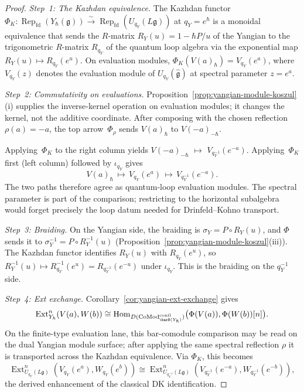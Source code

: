 \begin{proof}
\emph{Step~1: The Kazhdan equivalence.}
The Kazhdan functor~\cite{Drinfeld85}
$\Phi_K \colon \operatorname{Rep}_{\mathrm{fd}}(Y_\hbar(\mathfrak{g}))
\xrightarrow{\sim}
\operatorname{Rep}_{\mathrm{fd}}(U_{q_Y}(L\mathfrak{g}))$
at $q_Y=e^\hbar$ is a monoidal equivalence that sends
the $R$-matrix $R_Y(u) = 1 - \hbar P/u$ of the Yangian
to the trigonometric $R$-matrix $R_{q_Y}$ of the quantum loop algebra
via the exponential map
$R_Y(u) \mapsto R_{q_Y}(e^u)$. On evaluation modules,
$\Phi_K(V(a)_\hbar) = V_{q_Y}(e^a)$, where $V_{q_Y}(z)$ denotes
the evaluation module of
$U_{q_Y}(\widehat{\mathfrak{g}})$ at spectral parameter
$z = e^a$.

\smallskip\noindent\emph{Step~2: Commutativity on evaluations.}
Proposition~\ref{prop:yangian-module-koszul}(i) supplies the
inverse-kernel operation on evaluation modules; it changes the
kernel, not the additive coordinate. After composing with the chosen
reflection $\rho(a)=-a$, the top arrow~$\Phi_\rho$ sends
$V(a)_\hbar$ to $V(-a)_{-\hbar}$.

Applying~$\Phi_K$ to the right column yields
$V(-a)_{-\hbar}$ $\mapsto$ $V_{q_Y^{-1}}(e^{-a})$.
Applying~$\Phi_K$ first (left column) followed by
$\iota_{q_Y}$ gives
\[
V(a)_\hbar \,\mapsto\, V_{q_Y}(e^a) \,\mapsto\,
V_{q_Y^{-1}}(e^{-a}).
\]
The two paths therefore agree as quantum-loop evaluation modules.
The spectral parameter is part of the comparison; restricting to the
horizontal subalgebra would forget precisely the loop datum needed for
Drinfeld--Kohno transport.

\emph{Step~3: Braiding.}
On the Yangian side, the braiding is
$\sigma_Y = P \circ R_Y(u)$, and $\Phi$ sends it to
$\sigma_Y^{-1} = P \circ R_Y^{-1}(u)$
(Proposition~\ref{prop:yangian-module-koszul}(iii)).
The Kazhdan functor identifies $R_Y(u)$ with $R_{q_Y}(e^u)$,
so $R_Y^{-1}(u) \mapsto R_{q_Y}^{-1}(e^u) =
R_{q_Y^{-1}}(e^{-u})$ under $\iota_{q_Y}$.
This is the braiding on the $q_Y^{-1}$ side.

\emph{Step~4: Ext exchange.}
Corollary~\ref{cor:yangian-ext-exchange} gives
\[
\operatorname{Ext}^n_{Y_\hbar}(V(a), W(b))
\cong
\operatorname{Hom}_{D(\operatorname{CoMod}^{\mathrm{conil}}_{\barB(Y_\hbar)})}
\bigl(\Phi(V(a)), \Phi(W(b))[n]\bigr).
\]
On the finite-type evaluation lane, this bar-comodule comparison may
be read on the dual Yangian module surface; after applying the same
spectral reflection $\rho$ it is transported across the Kazhdan
equivalence.
Via $\Phi_K$, this becomes
\[
\operatorname{Ext}^n_{U_{q_Y}(L\mathfrak{g})}(V_{q_Y}(e^a), W_{q_Y}(e^b))
\cong \operatorname{Ext}^n_{U_{q_Y^{-1}}(L\mathfrak{g})}(V_{q_Y^{-1}}(e^{-a}),
W_{q_Y^{-1}}(e^{-b})),
\]
the derived enhancement of the classical DK identification.
\end{proof}

